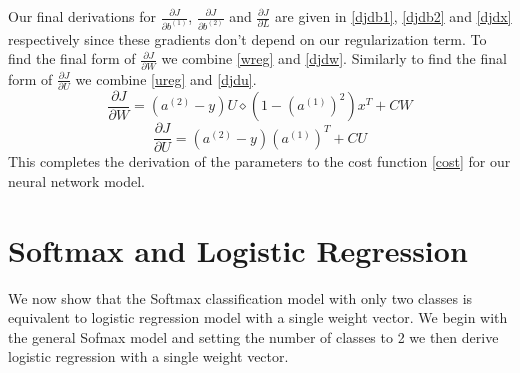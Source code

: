\documentclass{article}
\begin{document}
Our final derivations for \(\frac{\partial J}{\partial b^{(1)}}\), \(\frac{\partial J}{\partial b^{(2)}}\) and \(\frac{\partial J}{\partial L}\) are given in \eqref{djdb1}, \eqref{djdb2} and \eqref{djdx} respectively since these gradients don't depend on our regularization term.  To find the final form of \(\frac{\partial J}{\partial W}\) we combine \eqref{wreg} and \eqref{djdw}.  Similarly to find the final form of \(\frac{\partial J}{\partial U}\) we combine \eqref{ureg} and \eqref{djdu}.
\begin{equation}
\frac{\partial J}{\partial W} = \left(a^{(2)} - y\right) U \diamond\left( 1-(a^{(1)})^2 \right) x^T +CW
\end{equation}
\begin{equation}
\frac{\partial J}{\partial U} = \left(a^{(2)} - y\right)(a^{(1)})^T + CU
\end{equation}
This completes the derivation of the parameters to the cost function \eqref{cost} for our neural network model.

\section{Softmax and Logistic Regression}

We now show that the Softmax classification model with only two classes is equivalent to logistic regression model with a single weight vector.  We begin with the general Sofmax model and setting the number of classes to 2 we then derive logistic regression with a single weight vector.
\end{document}
